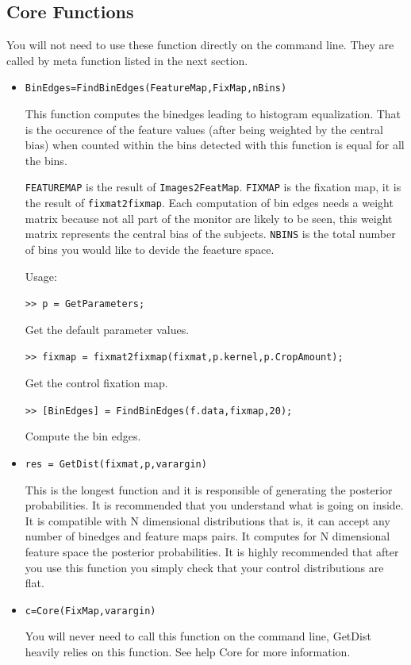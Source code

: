 \documentclass[a4paper,10pt]{report}
\begin{document}
\subsection{Core Functions}

You will not need to use these function directly on the command line. They are called by meta function listed in the next section.
\begin{itemize}
	
\item \texttt{BinEdges=FindBinEdges(FeatureMap,FixMap,nBins)}

This function computes the binedges leading to histogram equalization. That is the occurence of the feature values (after being weighted by the central bias) when counted within the bins detected with this function is equal for all the bins.

\texttt{FEATUREMAP} is the result of \texttt{Images2FeatMap}. \texttt{FIXMAP} is the fixation map, it is the result of \texttt{fixmat2fixmap}. Each computation of bin edges needs a weight matrix because not all part of the monitor
are likely to be seen, this weight matrix represents the central bias of the subjects. \texttt{NBINS} is the total number of bins you would like to devide the feaeture space.
		
Usage:

\texttt{>> p          = GetParameters;} 

Get the default parameter values.

\texttt{>> fixmap     = fixmat2fixmap(fixmat,p.kernel,p.CropAmount);}

Get the control fixation map.

\texttt{>> [BinEdges] = FindBinEdges(f.data,fixmap,20);}

Compute the bin edges.
 
\item \texttt{res = GetDist(fixmat,p,varargin)}	

This is the longest function and it is responsible of generating the posterior probabilities. It is recommended that you understand what is going on inside. It is compatible with N dimensional distributions that is, it can accept any number of binedges and feature maps pairs. It computes for N dimensional feature space the posterior probabilities. It is highly recommended that after you use this function you simply check that your control distributions are flat.

\item \texttt{c=Core(FixMap,varargin)}

You will never need to call this function on the command line, GetDist heavily relies on this function. See help Core for more information.
	
		
\end{itemize}
\end{document}
